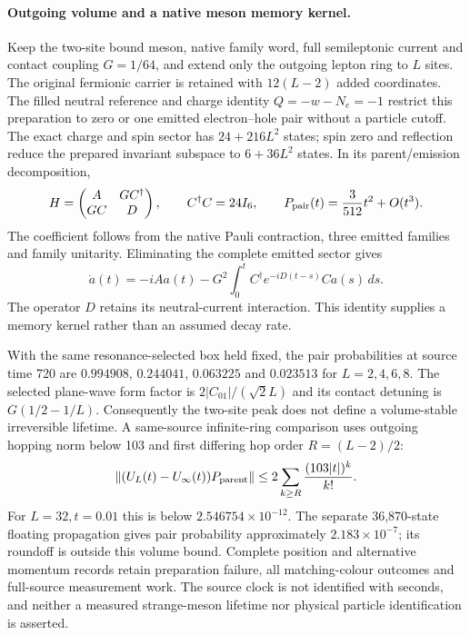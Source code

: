\paragraph{Outgoing volume and a native meson memory kernel.}
Keep the two-site bound meson, native family word, full semileptonic current
and contact coupling $G=1/64$, and extend only the outgoing lepton ring to
$L$ sites. The original fermionic carrier is retained with $12(L-2)$ added
coordinates. The filled neutral reference and charge identity
$Q=-w-N_e=-1$ restrict this preparation to zero or one emitted electron--hole
pair without a particle cutoff. The exact charge and spin sector has
$24+216L^2$ states; spin zero and reflection reduce the prepared invariant
subspace to $6+36L^2$ states. In its parent/emission decomposition,
\[
 H=\begin{pmatrix}A&GC^\dagger\\GC&D\end{pmatrix},\qquad
 C^\dagger C=24I_6,\qquad
 P_{\rm pair}(t)=\frac{3}{512}t^2+O(t^3).
\]
The coefficient follows from the native Pauli contraction, three emitted
families and family unitarity. Eliminating the complete emitted sector gives
\[
 \dot a(t)=-iAa(t)-G^2\int_0^t C^\dagger e^{-iD(t-s)}C a(s)\,ds .
\]
The operator $D$ retains its neutral-current interaction. This identity
supplies a memory kernel rather than an assumed decay rate.

With the same resonance-selected box held fixed, the pair probabilities at
source time 720 are $0.994908$, $0.244041$, $0.063225$ and $0.023513$ for
$L=2,4,6,8$. The selected plane-wave form factor is
$2|C_{01}|/(\sqrt2L)$ and its contact detuning is $G(1/2-1/L)$.
Consequently the two-site peak does not define a volume-stable irreversible
lifetime. A same-source infinite-ring comparison uses outgoing hopping norm
below 103 and first differing hop order $R=(L-2)/2$:
\[
 \|(U_L(t)-U_\infty(t))P_{\rm parent}\|
 \leq 2\sum_{k\geq R}\frac{(103|t|)^k}{k!}.
\]
For $L=32,t=0.01$ this is below $2.546754\times10^{-12}$. The separate
36,870-state floating propagation gives pair probability approximately
$2.183\times10^{-7}$; its roundoff is outside this volume bound. Complete
position and alternative momentum records retain preparation failure,
all matching-colour outcomes and full-source measurement work. The source
clock is not identified with seconds, and neither a measured strange-meson
lifetime nor physical particle identification is asserted.



